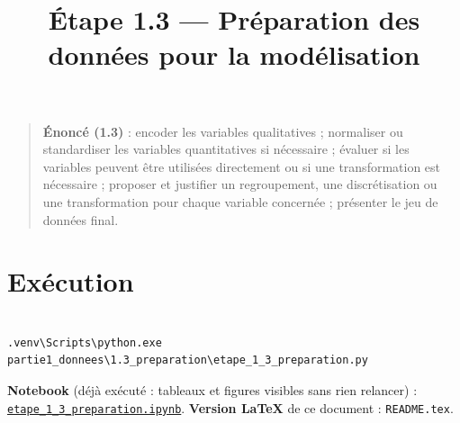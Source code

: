\documentclass[

  french,

  10pt,

  a4paper,

]{article}
\title{Étape 1.3 --- Préparation des données pour la modélisation}
\author{}
\date{}
\begin{document}
\maketitle



{

\hypersetup{linkcolor=black}

\setcounter{tocdepth}{3}

\tableofcontents

}

\begin{quote}

\textbf{Énoncé (1.3)} : encoder les variables qualitatives ; normaliser ou standardiser les variables quantitatives si nécessaire ; évaluer si les variables peuvent être utilisées directement ou si une transformation est nécessaire ; proposer et justifier un regroupement, une discrétisation ou une transformation pour chaque variable concernée ; présenter le jeu de données final.

\end{quote}



\section{Exécution}



\begin{verbatim}

.venv\Scripts\python.exe partie1_donnees\1.3_preparation\etape_1_3_preparation.py

\end{verbatim}



\textbf{Notebook} (déjà exécuté : tableaux et figures visibles sans rien relancer) : \href{etape_1_3_preparation.ipynb}{\texttt{etape\_1\_3\_preparation.ipynb}}. \textbf{Version LaTeX} de ce document : \texttt{README.tex}.
\end{document}

